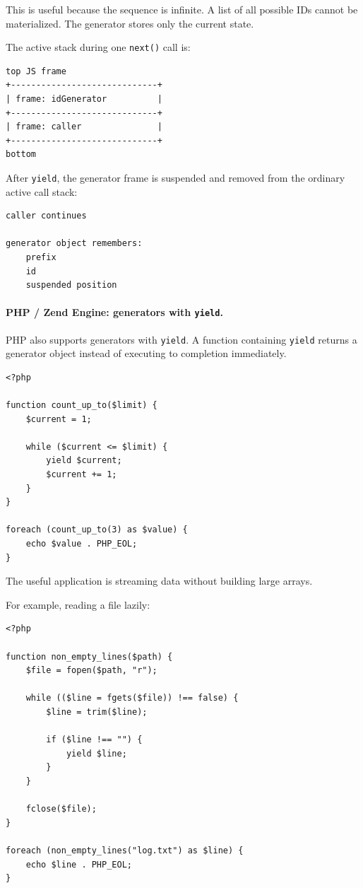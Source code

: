 This is useful because the sequence is infinite. A list of all possible IDs cannot be materialized. The generator stores only the current state.

The active stack during one \texttt{next()} call is:

\begin{verbatim}
top JS frame
+-----------------------------+
| frame: idGenerator          |
+-----------------------------+
| frame: caller               |
+-----------------------------+
bottom
\end{verbatim}

After \texttt{yield}, the generator frame is suspended and removed from the ordinary active call stack:

\begin{verbatim}
caller continues

generator object remembers:
    prefix
    id
    suspended position
\end{verbatim}

\paragraph{PHP / Zend Engine: generators with \texttt{yield}.}

PHP also supports generators with \texttt{yield}. A function containing \texttt{yield} returns a generator object instead of executing to completion immediately.

\begin{verbatim}
<?php

function count_up_to($limit) {
    $current = 1;

    while ($current <= $limit) {
        yield $current;
        $current += 1;
    }
}

foreach (count_up_to(3) as $value) {
    echo $value . PHP_EOL;
}
\end{verbatim}

The useful application is streaming data without building large arrays.

For example, reading a file lazily:

\begin{verbatim}
<?php

function non_empty_lines($path) {
    $file = fopen($path, "r");

    while (($line = fgets($file)) !== false) {
        $line = trim($line);

        if ($line !== "") {
            yield $line;
        }
    }

    fclose($file);
}

foreach (non_empty_lines("log.txt") as $line) {
    echo $line . PHP_EOL;
}
\end{verbatim}

